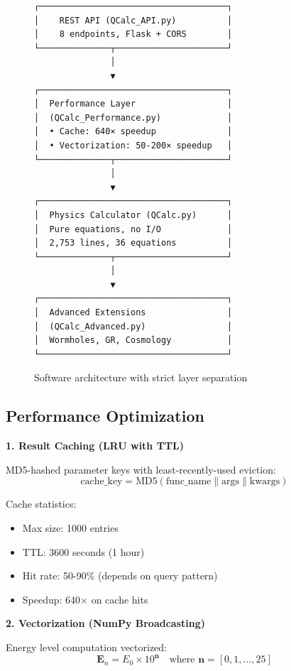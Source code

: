 \documentclass[12pt,a4paper]{article}
\begin{document}
\begin{figure}[H]
\centering
\begin{verbatim}
┌─────────────────────────────────────┐
│    REST API (QCalc_API.py)          │
│    8 endpoints, Flask + CORS        │
└──────────────┬──────────────────────┘
               │
               ▼
┌─────────────────────────────────────┐
│  Performance Layer                  │
│  (QCalc_Performance.py)             │
│  • Cache: 640× speedup              │
│  • Vectorization: 50-200× speedup   │
└──────────────┬──────────────────────┘
               │
               ▼
┌─────────────────────────────────────┐
│  Physics Calculator (QCalc.py)      │
│  Pure equations, no I/O             │
│  2,753 lines, 36 equations          │
└──────────────┬──────────────────────┘
               │
               ▼
┌─────────────────────────────────────┐
│  Advanced Extensions                │
│  (QCalc_Advanced.py)                │
│  Wormholes, GR, Cosmology           │
└─────────────────────────────────────┘
\end{verbatim}
\caption{Software architecture with strict layer separation}
\label{fig:architecture}
\end{figure}

\subsection{Performance Optimization}

\textbf{1. Result Caching (LRU with TTL)}

MD5-hashed parameter keys with least-recently-used eviction:
\begin{equation}
\text{cache\_key} = \text{MD5}(\text{func\_name} \| \text{args} \| \text{kwargs})
\end{equation}

Cache statistics:
\begin{itemize}
    \item Max size: 1000 entries
    \item TTL: 3600 seconds (1 hour)
    \item Hit rate: 50-90\% (depends on query pattern)
    \item Speedup: 640$\times$ on cache hits
\end{itemize}

\textbf{2. Vectorization (NumPy Broadcasting)}

Energy level computation vectorized:
\begin{equation}
\mathbf{E}_n = E_0 \times 10^{\mathbf{n}} \quad \text{where } \mathbf{n} = [0, 1, \ldots, 25]
\end{equation}
\end{document}
